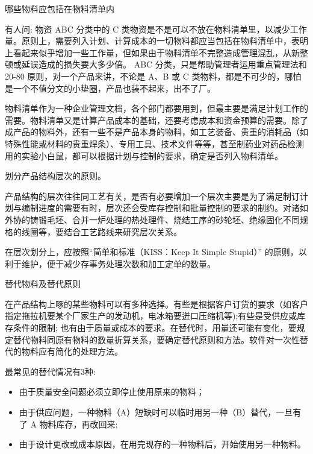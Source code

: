         \begin{enumerate.zh}
            \item 哪些物料应包括在物料清单内

            有人问: 物资 ABC 分类中的 C 类物资是不是可以不放在物料清单里，以减少工作量。原则上，需要列入计划、计算成本的一切物料都应当包括在物料清单中，表明上看起来似乎增加一些工作量，但如果由于物料清单不完整造成管理混乱，从新整顿或延误造成的损失要大多少倍。 ABC 分类，只是帮助管理者运用重点管理法和 20-80 原则，对一个产品来讲，不论是 A、B 或 C 类物料，都是不可少的，哪怕是一个不值分文的小垫圈，产品也装不起来，出不了厂。

            物料清单作为一种企业管理文档，各个部门都要用到，但最主要是满足计划工作的需要。物料清单又是计算产品成本的基础，还要考虑成本和资金预算的需要。除了成产品的物料外，还有一些不是产品本身的物料，如工艺装备、贵重的消耗品（如特殊性能或材料的贵重焊条）、专用工具、技术文件等等，甚至制药业对药品检测用的实验小白鼠，都可以根据计划与控制的要求，确定是否列入物料清单。

            \item 划分产品结构层次的原则。

            产品结构的层次往往同工艺有关，是否有必要增加一个层次主要是为了满足制订计划与编制进度的需要有时，层次还会受库存控制和批量控制的要求的制约。对诸如外协的铸锻毛坯、合并一炉处理的热处理件、烧结工序的砂轮坯、绝缘固化不同规格的线圈等，要结合工艺路线来研究层次关系。

            在层次划分上，应按照“简单和标准（KISS：Keep It Simple Stupid）” 的原则，以利于维护，便于减少存事务处理次数和加工定单的数量。

            \item  替代物料及替代原则

            在产品结构上啄的某些物料可以有多种选择。有些是根据客户订货的要求（如客户指定拖拉机要某个厂家生产的发动机，电冰箱要迸口压缩机等);有些是受供应或库存条件的限制; 也有由于质量或成本的要求。在替代时，用量还可能有变化，要规定替代物料同原有物料的数量折算关系，要确定替代原则和方法。软件对一次性替代的物料应有简化的处理方法。

            最常见的替代情况有3种:
                \begin{itemize}
                \item 由于质量安全问题必须立即停止使用原来的物料；
                \item 由于供应问题，一种物料（A）短缺时可以临时用另一种（B）替代，一旦有了 A 物料库存，再改回来;
                \item 由于设计更改或成本原因，在用完现存的一种物料后，开始使用另一种物料。
                \end{itemize}

        \end{enumerate.zh}

